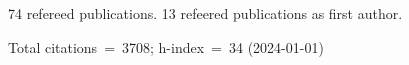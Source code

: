 74 refereed publications. 13 refeered publications as first author.

Total citations~=~3708; h-index~=~34 (2024-01-01)